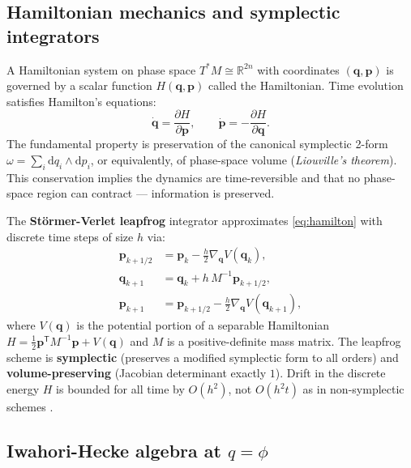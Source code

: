 \documentclass[11pt]{article}
\newcommand{\R}{\mathbb{R}}
\newcommand{\T}{\mathsf{T}}
\newcommand{\phigold}{\phi}
\newcommand{\qphase}{q}
\newcommand{\pphase}{p}
\begin{document}
\subsection{Hamiltonian mechanics and symplectic integrators}

A Hamiltonian system on phase space $T^*M \cong \R^{2n}$ with coordinates
$(\bm{\qphase}, \bm{\pphase})$ is governed by a scalar function $H(\bm{\qphase},
\bm{\pphase})$ called the Hamiltonian. Time evolution satisfies Hamilton's
equations:
\begin{equation}
\dot{\bm{\qphase}} = \frac{\partial H}{\partial \bm{\pphase}}, \qquad
\dot{\bm{\pphase}} = -\frac{\partial H}{\partial \bm{\qphase}}.
\label{eq:hamilton}
\end{equation}
The fundamental property is preservation of the canonical symplectic
2-form $\omega = \sum_i \mathrm{d}\qphase_i \wedge \mathrm{d}\pphase_i$,
or equivalently, of phase-space volume (\emph{Liouville's theorem}).
This conservation implies the dynamics are time-reversible and that no
phase-space region can contract --- information is preserved.

The \textbf{Störmer-Verlet leapfrog} integrator
\citep{verlet1967computer, leimkuhler2004simulating} approximates
\eqref{eq:hamilton} with discrete time steps of size $h$ via:
\begin{align}
\bm{\pphase}_{k+1/2} &= \bm{\pphase}_k - \tfrac{h}{2} \nabla_{\bm{\qphase}} V(\bm{\qphase}_k), \nonumber \\
\bm{\qphase}_{k+1} &= \bm{\qphase}_k + h \, M^{-1} \bm{\pphase}_{k+1/2}, \label{eq:leapfrog} \\
\bm{\pphase}_{k+1} &= \bm{\pphase}_{k+1/2} - \tfrac{h}{2} \nabla_{\bm{\qphase}} V(\bm{\qphase}_{k+1}), \nonumber
\end{align}
where $V(\bm{\qphase})$ is the potential portion of a separable Hamiltonian
$H = \tfrac{1}{2}\bm{\pphase}^\T M^{-1} \bm{\pphase} + V(\bm{\qphase})$
and $M$ is a positive-definite mass matrix. The leapfrog scheme is
\textbf{symplectic} (preserves a modified symplectic form to all orders)
and \textbf{volume-preserving} (Jacobian determinant exactly $1$).
Drift in the discrete energy $H$ is bounded for all time by $O(h^2)$,
not $O(h^2 t)$ as in non-symplectic schemes \citep{hairer2006geometric}.

\subsection{Iwahori-Hecke algebra at $q = \phigold$}
\end{document}
